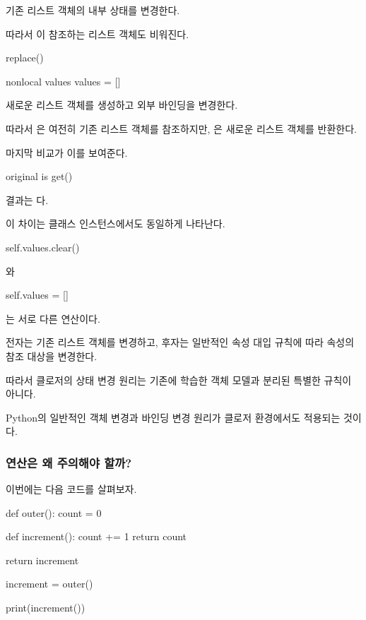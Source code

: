 기존 리스트 객체의 내부 상태를 변경한다.

따라서 이 참조하는 리스트 객체도 비워진다.

\begin{dhknote}
\begin{dhksmry}[centered]
replace()
\end{dhksmry}
\end{dhknote}

\begin{dhkcode}
nonlocal values
values = []
\end{dhkcode}

새로운 리스트 객체를 생성하고 외부 바인딩을 변경한다.

따라서 은 여전히 기존 리스트 객체를 참조하지만, 은 새로운 리스트 객체를 반환한다.

마지막 비교가 이를 보여준다.

\begin{dhkcode}
original is get()
\end{dhkcode}

결과는 다.

이 차이는 클래스 인스턴스에서도 동일하게 나타난다.

\begin{dhkcode}
self.values.clear()
\end{dhkcode}

와

\begin{dhkcode}
self.values = []
\end{dhkcode}

는 서로 다른 연산이다.

전자는 기존 리스트 객체를 변경하고, 후자는 일반적인 속성 대입 규칙에 따라  속성의 참조 대상을 변경한다.

따라서 클로저의 상태 변경 원리는 기존에 학습한 객체 모델과 분리된 특별한 규칙이 아니다.

Python의 일반적인 객체 변경과 바인딩 변경 원리가 클로저 환경에서도 적용되는 것이다.

\subsubsection{\zsh{+=} 연산은 왜 주의해야 할까?}

이번에는 다음 코드를 살펴보자.

\begin{dhkcode}
def outer():
    count = 0

    def increment():
        count += 1
        return count

    return increment


increment = outer()

print(increment())
\end{dhkcode}

